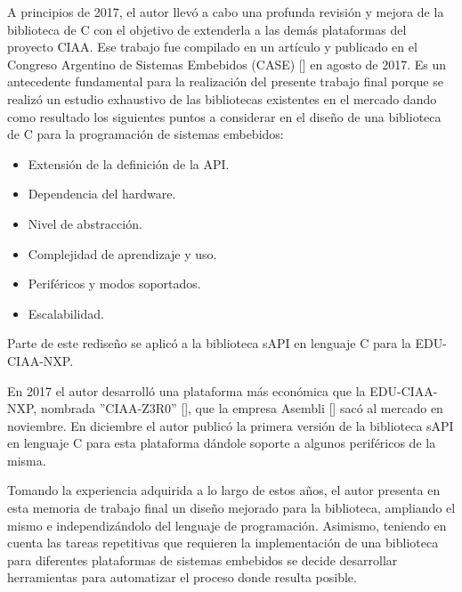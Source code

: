 A principios de 2017, el autor llevó a cabo una profunda revisión y mejora de la biblioteca de C con el objetivo de extenderla a las demás plataformas del proyecto CIAA.
Ese trabajo fue compilado en un artículo y publicado en el Congreso Argentino de Sistemas Embebidos (CASE) [] en agosto de 2017. Es un antecedente fundamental para la realización del presente trabajo final porque se realizó un estudio exhaustivo de las bibliotecas existentes en el mercado dando como resultado los siguientes puntos a considerar en el diseño de una biblioteca de C para la programación de sistemas embebidos:

\begin{itemize}
\item
Extensión de la definición de la API.
\item
Dependencia del hardware.
\item
Nivel de abstracción.
\item
Complejidad de aprendizaje y uso.
\item
Periféricos y modos soportados.
\item
Escalabilidad.
\end{itemize}

Parte de este rediseño se aplicó a la biblioteca sAPI en lenguaje C para la EDU-CIAA-NXP.

En 2017 el autor desarrolló una plataforma más económica que la EDU-CIAA-NXP, nombrada ''CIAA-Z3R0'' [], que la empresa Asembli [] sacó al mercado en noviembre. En diciembre el autor publicó la primera versión de la biblioteca sAPI en lenguaje C para esta plataforma dándole soporte a algunos periféricos de la misma.

Tomando la experiencia adquirida a lo largo de estos años, el autor presenta en esta memoria de trabajo final un diseño mejorado para la biblioteca, ampliando el mismo e independizándolo del lenguaje de programación. Asimismo, teniendo en cuenta las tareas repetitivas que requieren la implementación de una biblioteca para diferentes plataformas de sistemas embebidos se decide desarrollar herramientas para automatizar el proceso donde resulta posible.

